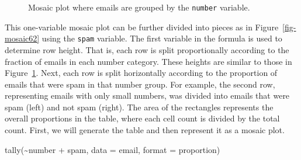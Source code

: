 \documentclass[
  letterpaper,
  DIV=11,
  numbers=noendperiod]{scrreprt}
\newenvironment{Shaded}{\begin{snugshade}}{\end{snugshade}}
\newcommand{\AttributeTok}[1]{\textcolor[rgb]{0.40,0.45,0.13}{#1}}
\newcommand{\FunctionTok}[1]{\textcolor[rgb]{0.28,0.35,0.67}{#1}}
\newcommand{\NormalTok}[1]{\textcolor[rgb]{0.00,0.23,0.31}{#1}}
\newcommand{\SpecialCharTok}[1]{\textcolor[rgb]{0.37,0.37,0.37}{#1}}
\newcommand{\StringTok}[1]{\textcolor[rgb]{0.13,0.47,0.30}{#1}}
\begin{document}
\begin{figure}[H]


\caption{\label{fig-mosaic61}Mosaic plot where emails are grouped by the
\texttt{number} variable.}

\end{figure}%

This one-variable mosaic plot can be further divided into pieces as in
Figure~\ref{fig-mosaic62} using the \texttt{spam} variable. The first
variable in the formula is used to determine row height. That is, each
row is split proportionally according to the fraction of emails in each
number category. These heights are similar to those in
Figure~\ref{fig-mosaic61}. Next, each row is split horizontally
according to the proportion of emails that were spam in that number
group. For example, the second row, representing emails with only small
numbers, was divided into emails that were spam (left) and not spam
(right). The area of the rectangles represents the overall proportions
in the table, where each cell count is divided by the total count.
First, we will generate the table and then represent it as a mosaic
plot.

\begin{Shaded}
\begin{Highlighting}[]
\FunctionTok{tally}\NormalTok{(}\SpecialCharTok{\textasciitilde{}}\NormalTok{number }\SpecialCharTok{+}\NormalTok{ spam, }\AttributeTok{data =}\NormalTok{ email, }\AttributeTok{format =} \StringTok{\textquotesingle{}proportion\textquotesingle{}}\NormalTok{)}
\end{Highlighting}
\end{Shaded}
\end{document}

